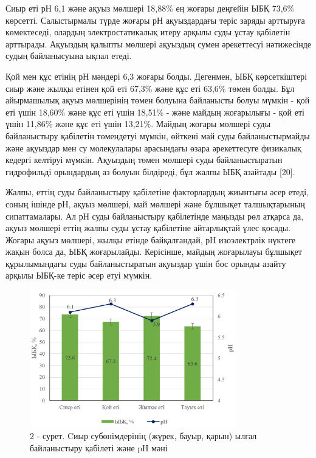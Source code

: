 \begin{multicols}{2}
Сиыр еті рН 6,1 және ақуыз мөлшері 18,88\% ең жоғары деңгейін ЫБҚ 73,6\%
көрсетті. Салыстырмалы түрде жоғары рН ақуыздардағы теріс заряды
арттыруға көмектеседі, олардың электростатикалық итеру арқылы суды ұстау
қабілетін арттырады. Ақуыздың қалыпты мөлшері ақуыздың сумен әрекеттесуі
нәтижесінде судың байланысуына ықпал етеді.

Қой мен құс етінің рН мәндері 6,3 жоғары болды. Дегенмен, ЫБҚ
көрсеткіштері сиыр және жылқы етінен қой еті 67,3\% және құс еті 63,6\%
төмен болды. Бұл айырмашылық ақуыз мөлшерінің төмен болуына байланысты
болуы мүмкін - қой еті үшін 18,60\% және құс еті үшін 18,51\% - және
майдың жоғарылығы - қой еті үшін 11,86\% және құс еті үшін 13,21\%.
Майдың жоғары мөлшері суды байланыстыру қабілетін төмендетуі мүмкін,
өйткені май суды байланыстырмайды және ақуыздар мен су молекулалары
арасындағы өзара әрекеттесуге физикалық кедергі келтіруі мүмкін.
Ақуыздың төмен мөлшері суды байланыстыратын гидрофильді орындардың аз
болуын білдіреді, бұл жалпы ЫБҚ азайтады {[}20{]}.

Жалпы, еттің суды байланыстыру қабілетіне факторлардың жиынтығы әсер
етеді, соның ішінде рН, ақуыз мөлшері, май мөлшері және бұлшықет
талшықтарының сипаттамалары. Ал рН суды байланыстыру қабілетінде маңызды
рөл атқарса да, ақуыз мөлшері еттің жалпы суды ұстау қабілетіне
айтарлықтай үлес қосады. Жоғары ақуыз мөлшері, жылқы етінде
байқалғандай, рН изоэлектрлік нүктеге жақын болса да, ЫБҚ жоғарылайды.
Керісінше, майдың жоғарылауы бұлшықет құрылымындағы суды байланыстыратын
ақуыздар үшін бос орынды азайту арқылы ЫБҚ-ке теріс әсер етуі мүмкін.
\end{multicols}

\begin{figure}[H]
	\centering
	\includegraphics[width=0.8\textwidth]{media/pish/image5}
	\caption*{2 - сурет. Cиыр субөнімдерінің (жүрек, бауыр, қарын) ылғал байланыстыру қабілеті және pH мәні}
\end{figure}

